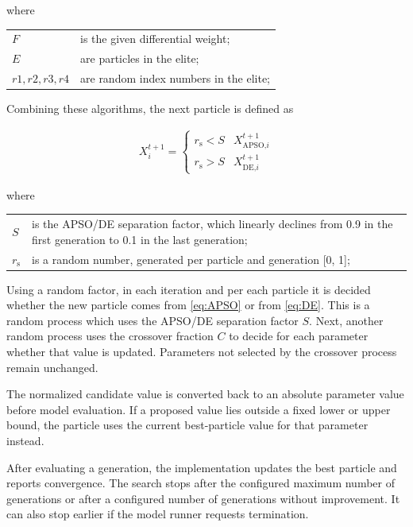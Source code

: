 where

\begin{longtable*}{p{18mm}p{\textwidth-24pt-18mm}}  
	$F$ & is the given differential weight; \\  
	$E$ & are particles in the elite; \\  
	$r1, r2, r3, r4$ & are random index numbers in the elite; \\  
\end{longtable*}

Combining these algorithms, the next particle is defined as 

\begin{align}\label{eq:APSODE}
X_i^{t+1} = \left\{\begin{array}{ll}r_{\text{s}} < S & X_{\text{APSO,} i}^{t+1}\\
r_{\text{s}} > S & X_{\text{DE,} i}^{t+1}
\end{array}	
\right.
\end{align}

where

\begin{longtable*}{p{18mm}p{\textwidth-24pt-18mm}}  
	$S$ & is the APSO/DE separation factor, which linearly declines from 0.9 in the first generation
	to 0.1 in the last generation; \\  
	$r_{\text{s}}$ & is a random number, generated per particle and generation [0, 1]; \\  
\end{longtable*}

Using a random factor, in each iteration and per each particle it is decided
whether the new particle comes from \autoref{eq:APSO} or from \autoref{eq:DE}.
This is a random process which uses the APSO/DE separation factor $S$.
Next, another random process uses the crossover fraction $C$ to decide for each parameter whether that value is updated.
Parameters not selected by the crossover process remain unchanged.

The normalized candidate value is converted back to an absolute parameter value before model evaluation.
If a proposed value lies outside a fixed lower or upper bound, the particle uses the current best-particle value for that parameter instead.

After evaluating a generation, the implementation updates the best particle and reports convergence.
The search stops after the configured maximum number of generations or after a configured number of generations without improvement.
It can also stop earlier if the model runner requests termination.


